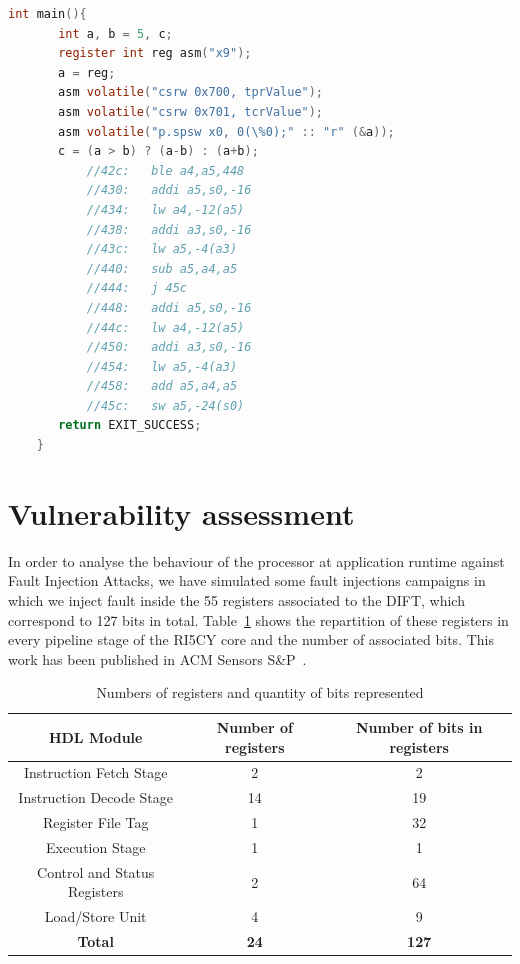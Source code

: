 \begin{lstlisting}[style=topPosition, caption=Compare/Compute C Code, language=C, label=code:compcompu]
    int main(){
       int a, b = 5, c;
       register int reg asm("x9");
       a = reg;
       asm volatile("csrw 0x700, tprValue");
       asm volatile("csrw 0x701, tcrValue");
       asm volatile("p.spsw x0, 0(\%0);" :: "r" (&a));
       c = (a > b) ? (a-b) : (a+b);
           //42c:   ble a4,a5,448
           //430:   addi a5,s0,-16
           //434:   lw a4,-12(a5)
           //438:   addi a3,s0,-16
           //43c:   lw a5,-4(a3)
           //440:   sub a5,a4,a5
           //444:   j 45c
           //448:   addi a5,s0,-16
           //44c:   lw a4,-12(a5)
           //450:   addi a3,s0,-16
           //454:   lw a5,-4(a3)
           //458:   add a5,a4,a5
           //45c:   sw a5,-24(s0)
       return EXIT_SUCCESS;
    }\end{lstlisting}

\section{Vulnerability assessment}
\label{section:vuln_assessment}
In order to analyse the behaviour of the processor at application runtime against Fault Injection Attacks, we have simulated some fault injections campaigns in which we inject fault inside the 55 registers associated to the DIFT, which correspond to 127 bits in total. Table~\ref{tab:registersDIFT} shows the repartition of these registers in every pipeline stage of the RI5CY core and the number of associated bits. This work has been published in ACM Sensors S\&P~\cite{PLG-22-SensorsSP}.%

\begin{table}[t]
    \centering
    \caption{Numbers of registers and quantity of bits represented}
    \label{tab:registersDIFT}
    \begin{tabular}{@{}ccc@{}}
        \toprule
        \textbf{HDL Module} & \textbf{Number of registers} & \textbf{Number of bits in registers} \\ \midrule
        Instruction Fetch Stage & 2 & 2 \\
        Instruction Decode Stage & 14 & 19 \\
        Register File Tag & 1 & 32 \\
        Execution Stage & 1 & 1 \\
        Control and Status Registers & 2 & 64 \\
        Load/Store Unit & 4 & 9 \\
        \midrule
        \midrule
        \textbf{Total} & \textbf{\textbf{24}} & \textbf{\textbf{127}} \\
        \bottomrule
    \end{tabular}
\end{table}

